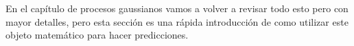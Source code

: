 
En el capítulo de procesos gaussianos vamos a volver a revisar todo esto pero con mayor detalles, pero esta sección es una rápida introducción de como utilizar este objeto matemático para hacer predicciones.